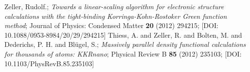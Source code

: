 

\begin{thebibliography}{10}
 Zeller, Rudolf.;
   \textit{Towards a linear-scaling algorithm for electronic structure calculations with the tight-binding Korringa-Kohn-Rostoker {Green} function method};
    Journal of Physics: Condensed Matter \textbf{20} (2012) 294215;
    [DOI: 10.1088/0953-8984/20/29/294215]
 Thiess, A. and Zeller, R. and Bolten, M. and Dederichs, P. H. and Bl{\"u}gel, S.;
   \textit{Massively parallel density functional calculations for thousands of atoms: {KKRnano}};
    Physical Review B \textbf{85} (2012) 235103;
    [DOI: 10.1103/PhysRevB.85.235103]
\end{thebibliography}
